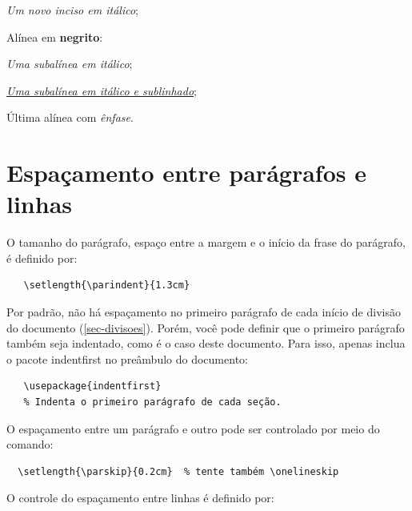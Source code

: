 \begin{alineas}
  \begin{incisos}
    \item \textit{Um novo inciso em itálico};
  \end{incisos}
  
  \item Alínea em \textbf{negrito}:
  
  \begin{subalineas}
    \item \textit{Uma subalínea em itálico};
    \item \underline{\textit{Uma subalínea em itálico e sublinhado}}; 
  \end{subalineas}
  
  \item Última alínea com \emph{ênfase}.
  
\end{alineas}

\section{Espaçamento entre parágrafos e linhas}

O tamanho do parágrafo, espaço entre a margem
e o início da frase do parágrafo, é definido por:

\begin{verbatim}
   \setlength{\parindent}{1.3cm}
\end{verbatim}

Por padrão, não há espaçamento no
primeiro parágrafo de cada início de divisão do documento
(\autoref{sec-divisoes}). Porém, você pode definir que o primeiro parágrafo
também seja indentado, como é o caso deste documento. Para isso, apenas inclua o
pacote \textsf{indentfirst} no preâmbulo do documento:

\begin{verbatim}
   \usepackage{indentfirst}
   % Indenta o primeiro parágrafo de cada seção.
\end{verbatim}

O espaçamento entre um parágrafo e outro
pode ser controlado por meio do comando:

\begin{verbatim}
  \setlength{\parskip}{0.2cm}  % tente também \onelineskip
\end{verbatim}

O controle do espaçamento entre linhas é
definido por:

